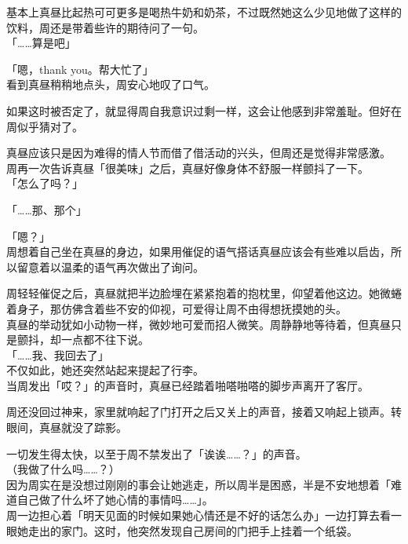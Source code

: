 基本上真昼比起热可可更多是喝热牛奶和奶茶，不过既然她这么少见地做了这样的饮料，周还是带着些许的期待问了一句。\\

「……算是吧」

「嗯，thank you。帮大忙了」\\

看到真昼稍稍地点头，周安心地叹了口气。

如果这时被否定了，就显得周自我意识过剩一样，这会让他感到非常羞耻。但好在周似乎猜对了。

真昼应该只是因为难得的情人节而借了借活动的兴头，但周还是觉得非常感激。\\

周再一次告诉真昼「很美味」之后，真昼好像身体不舒服一样颤抖了一下。\\

「怎么了吗？」

「……那、那个」

「嗯？」\\

周想着自己坐在真昼的身边，如果用催促的语气搭话真昼应该会有些难以启齿，所以留意着以温柔的语气再次做出了询问。

周轻轻催促之后，真昼就把半边脸埋在紧紧抱着的抱枕里，仰望着他这边。她微蜷着身子，那仿佛含着些不安的仰视，可爱得让周不由得想抚摸她的头。\\

真昼的举动犹如小动物一样，微妙地可爱而招人微笑。周静静地等待着，但真昼只是颤抖，却一点都不往下说。\\

「……我、我回去了」\\

不仅如此，她还突然站起来提起了行李。\\%

当周发出「哎？」的声音时，真昼已经踏着啪嗒啪嗒的脚步声离开了客厅。

周还没回过神来，家里就响起了门打开之后又关上的声音，接着又响起上锁声。转眼间，真昼就没了踪影。

一切发生得太快，以至于周不禁发出了「诶诶……？」的声音。\\

（我做了什么吗……？）\\

因为周实在是没想过刚刚的事会让她逃走，所以周半是困惑，半是不安地想着「难道自己做了什么坏了她心情的事情吗……」。\\

周一边担心着「明天见面的时候如果她心情还是不好的话怎么办」一边打算去看一眼她走出的家门。这时，他突然发现自己房间的门把手上挂着一个纸袋。


